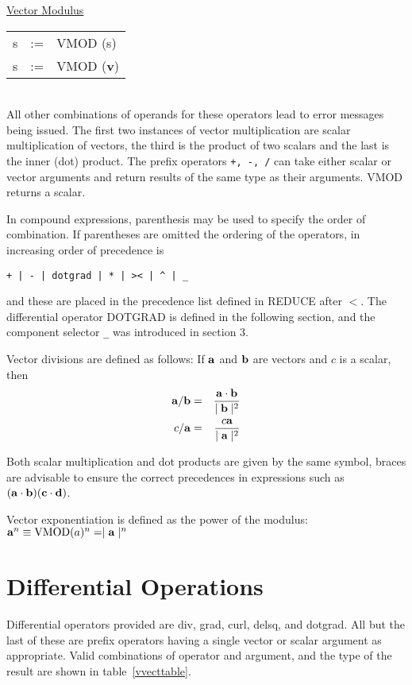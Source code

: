 \underline{Vector Modulus}\\
 
\begin{tabular}{rcl}
   s    &:=& VMOD (s)\\
   s    &:=& VMOD ({\bf v}) \\
\end{tabular} \\

All other combinations of operands for these operators lead to error 
messages being issued.  The first two instances of vector
multiplication are scalar multiplication of vectors, the third is the
 
 
product of two scalars and the last is the inner (dot) product.  The
prefix operators  {\tt +, -, /} can take either scalar or vector
arguments and return results of the same type as their arguments. 
VMOD returns a scalar.

In compound expressions, parenthesis may be used to specify the order of 
combination.  If parentheses are omitted the ordering of the
operators, in increasing order of precedence is
\begin{verbatim}
+ | - | dotgrad | * | >< | ^ | _
\end{verbatim}
and these are placed in the precedence list defined in REDUCE
after $<$.
The differential operator DOTGRAD is defined in the 
following section, and the component selector {\tt \_} was introduced in
section 3.

Vector divisions are defined as follows:  If ${\bf a}$ and ${\bf b}$ are
vectors and $c$ is a scalar, then
\begin{eqnarray*}
{\bf a} /  {\bf b} & = &  \frac{{\bf a} \cdot {\bf b}}{  \mid {\bf b} 
\mid^2}\\
c / {\bf a}   & = &  \frac{c {\bf a}  }{ \mid {\bf a} \mid^2}
\end{eqnarray*}

Both scalar multiplication and dot products are given by the same symbol, 
braces are advisable to ensure the correct
precedences in expressions such as $({\bf a} \cdot {\bf b}) 
({\bf c} \cdot {\bf d})$.

Vector exponentiation is defined as the power of the modulus:\\
${\bf a}^n \equiv  {\rm VMOD}(a)^n =   \mid {\bf a} \mid^n$

\section{Differential Operations}
Differential operators provided are div, grad, curl, delsq, and dotgrad.
  
 
All but the last of these are prefix operators having a single
vector or scalar argument as appropriate.  Valid combinations of 
operator and argument, and the type of the result are shown in table~\ref{vvecttable}.


